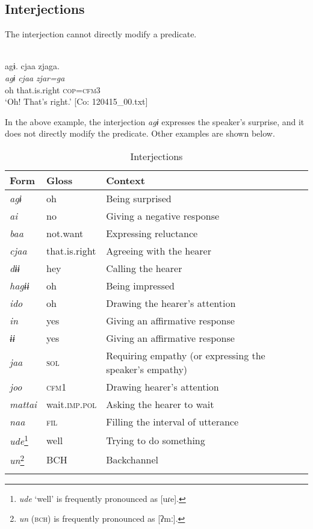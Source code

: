 \subsection{Interjections}\label{sec:4.3.7}

The interjection cannot directly modify a predicate.

\ea{}\label{ex:4.56}\\
\glll    agɨ.  cjaa  zjaga.  \\
    \textit{agɨ}  \textit{cjaa}  \textit{zjar=ga}  \\
    oh  that.is.right  \textsc{cop}=\textsc{cfm}3  \\
  \glt     ‘Oh! That’s right.’ [Co: 120415\_00.txt]
\z

In the above example, the interjection \textit{agɨ} expresses the speaker’s surprise, and it does not directly modify the predicate. Other examples are shown below.

\begin{table}
\caption{\label{tab:29}Interjections}
\begin{tabular}{lll}
\lsptoprule
Form & Gloss & Context\\\midrule
\textit{agɨ}   & oh              & Being surprised\\
\textit{ai}    & no              & Giving a negative response\\
\textit{baa}   & not.want        & Expressing reluctance\\
\textit{cjaa}  &  that.is.right  & Agreeing with the hearer\\
\textit{dɨɨ}   & hey             & Calling the hearer\\
\textit{hagɨɨ} & oh            & Being impressed\\
\textit{ido}   & oh              & Drawing the hearer’s attention\\
\textit{in}    & yes              & Giving an affirmative response\\
\textit{ɨɨ}    & yes              & Giving an affirmative response\\
\textit{jaa}   & \textsc{sol}             & Requiring empathy (or expressing the speaker’s empathy)\\
\textit{joo}   & \textsc{cfm}1            & Drawing hearer’s attention\\
\textit{mattai} &  wait.\textsc{imp}.\textsc{pol} & Asking the hearer to wait\\
\textit{naa}   & \textsc{fil}             & Filling the interval of utterance\\
\textit{ude}\footnote{\textit{ude} ‘well’ is frequently pronounced as [uɾe].} & well & Trying to do something\\
\textit{un}\footnote{\textit{un} (\textsc{bch}) is frequently pronounced as [ʔmː].}    & BCH   &Backchannel\\
\lspbottomrule
\end{tabular}
\end{table}

